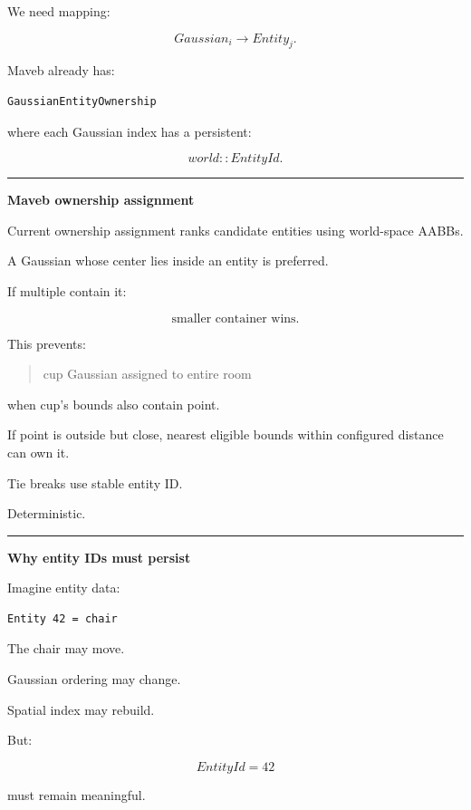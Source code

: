 We need mapping:

\[
\boxed{
Gaussian_i
\rightarrow
Entity_j.
}
\]

Maveb already has:

\begin{verbatim}
GaussianEntityOwnership
\end{verbatim}

where each Gaussian index has a persistent:

\[
world::EntityId.
\]

\begin{center}\rule{0.5\linewidth}{0.5pt}\end{center}

\textbf{Maveb ownership assignment}

Current ownership assignment ranks candidate entities using world-space AABBs.

A Gaussian whose center lies inside an entity is preferred.

If multiple contain it:

\[
\boxed{
\text{smaller container wins}.
}
\]

This prevents:

\begin{quote}
cup Gaussian assigned to entire room
\end{quote}

when cup's bounds also contain point.

If point is outside but close, nearest eligible bounds within configured distance can own it.

Tie breaks use stable entity ID.

Deterministic.

\begin{center}\rule{0.5\linewidth}{0.5pt}\end{center}

\textbf{Why entity IDs must persist}

Imagine entity data:

\protect{}\label{7x0yqd}%
\begin{verbatim}
Entity 42 = chair
\end{verbatim}

The chair may move.

Gaussian ordering may change.

Spatial index may rebuild.

But:

\[
EntityId=42
\]

must remain meaningful.

